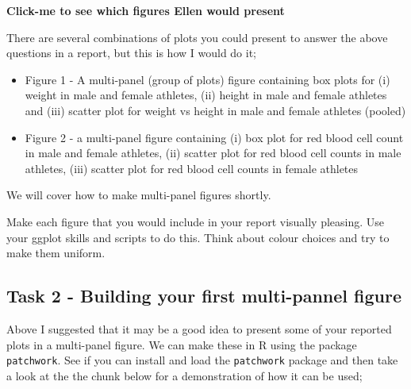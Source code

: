 \documentclass[
]{book}
\providecommand{\tightlist}{%
  \setlength{\itemsep}{0pt}\setlength{\parskip}{0pt}}
\begin{document}
\textbf{Click-me to see which figures Ellen would present}

There are several combinations of plots you could present to answer the above questions in a report, but this is how I would do it;

\begin{itemize}
\tightlist
\item
  Figure 1 - A multi-panel (group of plots) figure containing box plots for (i) weight in male and female athletes, (ii) height in male and female athletes and (iii) scatter plot for weight vs height in male and female athletes (pooled)
\item
  Figure 2 - a multi-panel figure containing (i) box plot for red blood cell count in male and female athletes, (ii) scatter plot for red blood cell counts in male athletes, (iii) scatter plot for red blood cell counts in female athletes
\end{itemize}

We will cover how to make multi-panel figures shortly.

Make each figure that you would include in your report visually pleasing. Use your ggplot skills and scripts to do this. Think about colour choices and try to make them uniform.

\hypertarget{task-2---building-your-first-multi-pannel-figure}{%
\subsection{Task 2 - Building your first multi-pannel figure}\label{task-2---building-your-first-multi-pannel-figure}}

Above I suggested that it may be a good idea to present some of your reported plots in a multi-panel figure. We can make these in R using the package \texttt{patchwork}. See if you can install and load the \texttt{patchwork} package and then take a look at the the chunk below for a demonstration of how it can be used;
\end{document}
